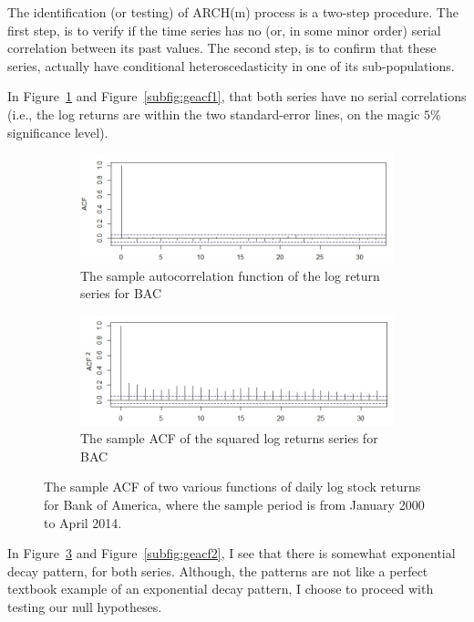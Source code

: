 \documentclass[a4paper,11pt,english]{article}
\begin{document}
        	The identification (or testing) of ARCH(m) process is a two-step procedure. The first step, is to verify if the time series has no (or, in some 
        	minor order) serial correlation between its past values. The second step, is to confirm that these series, actually have conditional
        	heteroscedasticity in one of its sub-populations.   
    
     		In Figure~\ref{subfig:bacacf1} and Figure~\ref{subfig:geacf1}, that both series have no serial correlations (i.e., the log returns are within 
     		the two standard-error lines, on the magic $5\%$ significance level).

			\begin{figure}[H]
				\centering
				\begin{subfigure}[b]{0.95\textwidth}
					\includegraphics[width=1\linewidth]{BACACF}
					\caption{The sample autocorrelation function of the log return series for BAC}
					\label{subfig:bacacf1} 
				\end{subfigure}
				\begin{subfigure}[b]{0.95\textwidth}
					\includegraphics[width=1\linewidth]{BACACF2}
					\caption{The sample ACF of the squared log returns series for BAC}
					\label{subfig:bacacf2}
				\end{subfigure}
				\caption[numsol]{The sample ACF of two various functions of daily log stock returns for Bank of America, where the sample period is 
				from January 2000 to April 2014.}
				\end{figure}
			
			In Figure~\ref{subfig:bacacf2} and Figure~\ref{subfig:geacf2}, I see that there is somewhat exponential decay pattern, for both 
			series. Although, the patterns are not like a perfect textbook example of an exponential decay pattern, I choose to proceed with testing our
			null hypotheses.
\end{document}
